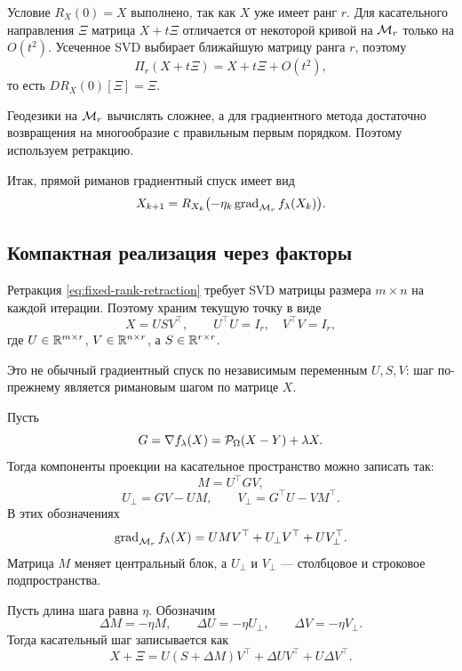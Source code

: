 Условие $R_X(0)=X$ выполнено, так как $X$ уже имеет ранг $r$. Для касательного направления $\Xi$ матрица $X+t\Xi$ отличается от некоторой кривой на $\mathcal{M}_r$ только на $O(t^2)$. Усеченное SVD выбирает ближайшую матрицу ранга $r$, поэтому
\[
\Pi_r(X+t\Xi)=X+t\Xi+O(t^2),
\]
то есть $DR_X(0)[\Xi]=\Xi$.

Геодезики на $\mathcal{M}_r$ вычислять сложнее, а для градиентного метода достаточно возвращения на многообразие с правильным первым порядком. Поэтому используем ретракцию.

Итак, прямой риманов градиентный спуск имеет вид
\begin{equation}
\label{eq:rgd}
X_{k+1}
=
R_{X_k}\bigl(-\eta_k\operatorname{grad}_{\mathcal{M}_r} f_\lambda(X_k)\bigr).
\end{equation}

\subsection{Компактная реализация через факторы}

Ретракция \eqref{eq:fixed-rank-retraction} требует SVD матрицы размера $m\times n$ на каждой итерации. Поэтому храним текущую точку в виде
\[
X=USV^\top,\qquad U^\top U=I_r,\quad V^\top V=I_r,
\]
где $U\in\mathbb{R}^{m\times r}$, $V\in\mathbb{R}^{n\times r}$, а $S\in\mathbb{R}^{r\times r}$.

Это не обычный градиентный спуск по независимым переменным $U,S,V$: шаг по-прежнему является римановым шагом по матрице $X$.

Пусть
\[
G=\nabla f_\lambda(X)=\mathcal{P}_\Omega(X-Y)+\lambda X.
\]
Тогда компоненты проекции на касательное пространство можно записать так:
\[
M=U^\top G V,
\]
\[
U_\perp=GV-UM,\qquad V_\perp=G^\top U-VM^\top.
\]
В этих обозначениях
\[
\operatorname{grad}_{\mathcal{M}_r} f_\lambda(X)
=UMV^\top+U_\perp V^\top+UV_\perp^\top.
\]
Матрица $M$ меняет центральный блок, а $U_\perp$ и $V_\perp$ --- столбцовое и строковое подпространства.

Пусть длина шага равна $\eta$. Обозначим
\[
\Delta M=-\eta M,\qquad
\Delta U=-\eta U_\perp,\qquad
\Delta V=-\eta V_\perp.
\]
Тогда касательный шаг записывается как
\begin{equation}
\label{eq:compact-tangent-step}
X+\Xi
=U(S+\Delta M)V^\top+\Delta U V^\top+U\Delta V^\top.
\end{equation}

